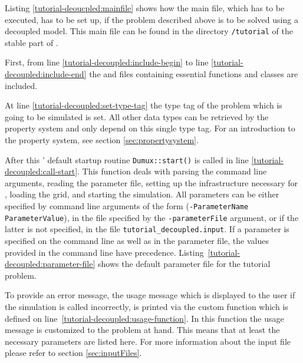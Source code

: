 Listing \ref{tutorial-deoucpled:mainfile} shows how the main file, which has to be executed, has to be set up, if the problem described above is to be solved using a decoupled model. This main file can be found in the directory \texttt{/tutorial} of the stable part of \Dumux.

\begin{lst}\label{tutorial-deoucpled:mainfile} \mbox{}

\end{lst}

First, from line \ref{tutorial-decoupled:include-begin} to line
\ref{tutorial-decoupled:include-end} the \Dune and \Dumux files containing
essential functions and classes are included.

At line \ref{tutorial-decoupled:set-type-tag} the type tag of the
problem which is going to be simulated is set. All other data types
can be retrieved by the \Dumux property system and only depend on this
single type tag. For an introduction to the
property system, see section \ref{sec:propertysystem}.

After this \Dumux' default startup routine \texttt{Dumux::start()} is
called in line \ref{tutorial-decoupled:call-start}. This function deals
with parsing the command line arguments, reading the parameter file,
setting up the infrastructure necessary for \Dune, loading the grid, and
starting the simulation. All parameters can
be either specified by command line arguments of the form
(\texttt{-ParameterName ParameterValue}), in the file specified by the
\texttt{-parameterFile} argument, or if the latter is not specified,
in the file \texttt{tutorial\_decoupled.input}. If a parameter is
specified on the command line as well as in the parameter file, the
values provided in the command line have
precedence. Listing~\ref{tutorial-decoupled:parameter-file} shows the
default parameter file for the tutorial problem.

\begin{lst}\label{tutorial-decoupled:parameter-file} \mbox{}

\end{lst}

To provide an error message, the usage message which is displayed to
the user if the simulation is called incorrectly, is printed via the
custom function which is defined on
line~\ref{tutorial-decoupled:usage-function}. In this function the usage
message is customized to the problem at hand. This means that at least
the necessary parameters are listed here.  For more information about
the input file please refer to section \ref{sec:inputFiles}.

